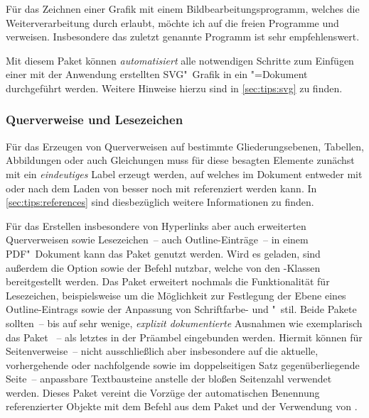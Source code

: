 Für das Zeichnen einer Grafik mit einem Bildbearbeitungsprogramm, welches die 
Weiterverarbeitung durch  erlaubt, möchte ich auf die freien 
Programme  und  verweisen. 
Insbesondere das zuletzt genannte Programm ist sehr empfehlenswert. 
%
\begin{DeclarePackages}
  Mit diesem Paket können \emph{automatisiert} alle notwendigen Schritte zum 
  Einfügen einer mit der Anwendung  erstellten 
  SVG"~Grafik in ein "=Dokument durchgeführt werden. Weitere 
  Hinweise hierzu sind in \autoref{sec:tips:svg} zu finden.
\end{DeclarePackages}
%



\subsubsection{%
  Querverweise und Lesezeichen%
}
%
Für das Erzeugen von Querverweisen auf bestimmte Gliederungsebenen, Tabellen, 
Abbildungen oder auch Gleichungen muss für diese besagten Elemente zunächst mit 
 ein \emph{eindeutiges} Label erzeugt werden, auf 
welches im Dokument entweder mit  oder nach dem Laden von 
 besser noch mit  referenziert werden kann. In 
\autoref{sec:tips:references} sind diesbezüglich weitere Informationen zu 
finden.
%
\begin{DeclarePackages}
  Für das Erstellen insbesondere von Hyperlinks aber auch erweiterten 
  Querverweisen sowie Lesezeichen~-- auch Outline-Einträge~-- in einem 
  PDF"~Dokument kann das Paket  genutzt werden. Wird 
  es geladen, sind außerdem die Option  sowie der Befehl 
   nutzbar, welche von den \TUDScript-Klassen bereitgestellt 
  werden. Das Paket  erweitert nochmals die Funktionalität 
  für Lesezeichen, beispielsweise um die Möglichkeit zur Festlegung der Ebene 
  eines Outline-Eintrags sowie der Anpassung von Schriftfarbe- und "~stil.
  Beide Pakete sollten~-- bis auf sehr wenige, \emph{explizit dokumentierte} 
  Ausnahmen wie exemplarisch das Paket ~-- als letztes in 
  der Präambel eingebunden werden.
  Hiermit können für Seitenverweise~-- nicht ausschließlich aber insbesondere 
  auf die aktuelle, vorhergehende oder nachfolgende sowie im doppelseitigen 
  Satz gegenüberliegende Seite~-- anpassbare Textbausteine anstelle der bloßen 
  Seitenzahl verwendet werden.
  Dieses Paket vereint die Vorzüge der automatischen Benennung referenzierter 
  Objekte mit dem Befehl  aus dem Paket  und 
  der Verwendung von .
\end{DeclarePackages}
%
%



